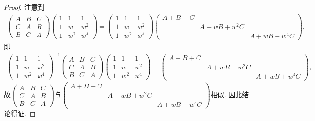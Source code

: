 \documentclass[../../main.tex]{subfiles}
\begin{document}
\begin{proof}
注意到
\begin{align*}
\begin{pmatrix}
A & B & C \\
C & A & B \\
B & C & A
\end{pmatrix}
\begin{pmatrix}
1 & 1 & 1 \\
1 & w & w^2 \\
1 & w^2 & w^4
\end{pmatrix}
=
\begin{pmatrix}
1 & 1 & 1 \\
1 & w & w^2 \\
1 & w^2 & w^4
\end{pmatrix}
\begin{pmatrix}
A+B+C & & \\
& A+wB+w^2C & \\
& & A+wB+w^4C
\end{pmatrix},
\end{align*}
即
\begin{align*}
\begin{pmatrix}
1 & 1 & 1 \\
1 & w & w^2 \\
1 & w^2 & w^4
\end{pmatrix}^{-1}
\begin{pmatrix}
A & B & C \\
C & A & B \\
B & C & A
\end{pmatrix}
\begin{pmatrix}
1 & 1 & 1 \\
1 & w & w^2 \\
1 & w^2 & w^4
\end{pmatrix}
=
\begin{pmatrix}
A+B+C & & \\
& A+wB+w^2C & \\
& & A+wB+w^4C
\end{pmatrix},
\end{align*}
故$\begin{pmatrix}
A & B & C \\
C & A & B \\
B & C & A
\end{pmatrix}$与$\begin{pmatrix}
A+B+C & & \\
& A+wB+w^2C & \\
& & A+wB+w^4C
\end{pmatrix}$相似. 因此结论得证.

\end{proof}
\end{document}
